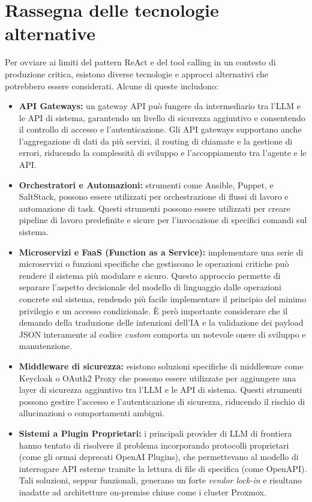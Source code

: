 \section{Rassegna delle tecnologie alternative}
Per ovviare ai limiti del pattern ReAct e del tool calling in un contesto di produzione critica, esistono diverse tecnologie e approcci alternativi che potrebbero essere considerati. Alcune di queste includono:
\begin{itemize}
    \item \textbf{API Gateways:} un gateway API può fungere da intermediario tra l'LLM e le API di sistema, garantendo un livello di sicurezza aggiuntivo e consentendo il controllo di accesso e l'autenticazione. Gli API gateways supportano anche l'aggregazione di dati da più servizi, il routing di chiamate e la gestione di errori, riducendo la complessità di sviluppo e l'accoppiamento tra l'agente e le API.

    \item \textbf{Orchestratori e Automazioni:} strumenti come Ansible, Puppet, e SaltStack, possono essere utilizzati per orchestrazione di flussi di lavoro e automazione di task. Questi strumenti possono essere utilizzati per creare pipeline di lavoro predefinite e sicure per l'invocazione di specifici comandi sul sistema.

    \item \textbf{Microservizi e FaaS (Function as a Service):} implementare una serie di microservizi o funzioni specifiche che gestiscono le operazioni critiche può rendere il sistema più modulare e sicuro. Questo approccio permette di separare l'aspetto decisionale del modello di linguaggio dalle operazioni concrete sul sistema, rendendo più facile implementare il principio del minimo privilegio e un accesso condizionale. È però importante considerare che il demando della traduzione delle intenzioni dell'IA e la validazione dei payload JSON interamente al codice \textit{custom} comporta un notevole onere di sviluppo e manutenzione.

    \item \textbf{Middleware di sicurezza:} esistono soluzioni specifiche di middleware come Keycloak o OAuth2 Proxy che possono essere utilizzate per aggiungere una layer di sicurezza aggiuntivo tra l'LLM e le API di sistema. Questi strumenti possono gestire l'accesso e l'autenticazione di sicurezza, riducendo il rischio di allucinazioni o comportamenti ambigui.

    \item \textbf{Sistemi a Plugin Proprietari:} i principali provider di LLM di frontiera hanno tentato di risolvere il problema incorporando protocolli proprietari (come gli ormai deprecati OpenAI Plugins), che permettevano al modello di interrogare API esterne tramite la lettura di file di specifica (come OpenAPI). Tali soluzioni, seppur funzionali, generano un forte \textit{vendor lock-in} e risultano inadatte ad architetture on-premise chiuse come i cluster Proxmox.
\end{itemize}
